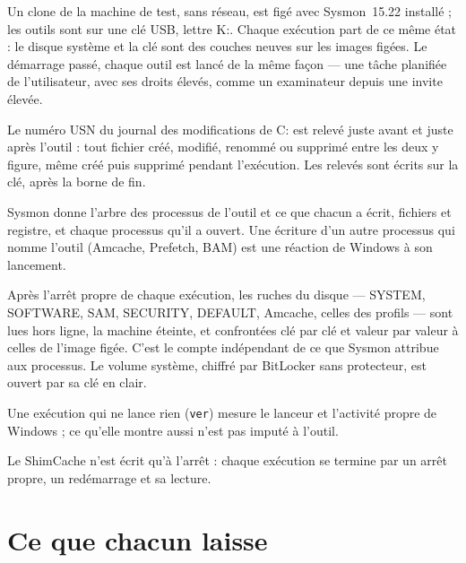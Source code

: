 \documentclass[11pt,a4paper,oneside]{report}
\begin{document}
Un clone de la machine de test, sans réseau, est figé avec Sysmon~15.22 installé ;
les outils sont sur une clé USB, lettre K:. Chaque exécution part de ce même
état : le disque système et la clé sont des couches neuves sur les images
figées. Le démarrage passé, chaque outil est lancé de la même façon --- une
tâche planifiée de l'utilisateur, avec ses droits élevés, comme un examinateur
depuis une invite élevée.

\begin{description}[style=nextline,leftmargin=1em]
  \item[Les fichiers] Le numéro USN du journal des modifications de C: est relevé
        juste avant et juste après l'outil : tout fichier créé, modifié, renommé
        ou supprimé entre les deux y figure, même créé puis supprimé pendant
        l'exécution. Les relevés sont écrits sur la clé, après la borne de fin.
  \item[L'auteur] Sysmon donne l'arbre des processus de l'outil et ce que chacun
        a écrit, fichiers et registre, et chaque processus qu'il a ouvert. Une
        écriture d'un autre processus qui nomme l'outil (Amcache, Prefetch, BAM)
        est une réaction de Windows à son lancement.
  \item[Le registre] Après l'arrêt propre de chaque exécution, les ruches du
        disque --- SYSTEM, SOFTWARE, SAM, SECURITY, DEFAULT, Amcache, celles des
        profils --- sont lues hors ligne, la machine éteinte, et confrontées
        clé par clé et valeur par valeur à celles de l'image figée. C'est le
        compte indépendant de ce que Sysmon attribue aux processus. Le volume
        système, chiffré par BitLocker sans protecteur, est ouvert par sa clé en
        clair.
  \item[Le témoin] Une exécution qui ne lance rien (\texttt{ver}) mesure le
        lanceur et l'activité propre de Windows ; ce qu'elle montre aussi n'est
        pas imputé à l'outil.
  \item[Le différé] Le ShimCache n'est écrit qu'à l'arrêt : chaque exécution se
        termine par un arrêt propre, un redémarrage et sa lecture.
\end{description}

\section{Ce que chacun laisse}
\end{document}
